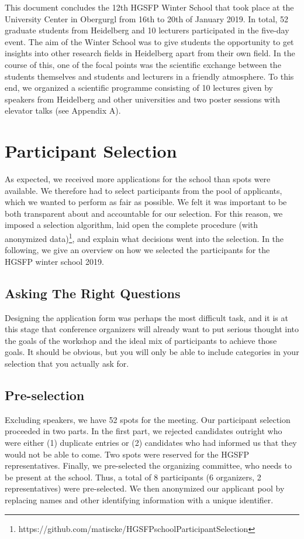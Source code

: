 This document concludes the 12th HGSFP Winter School that took place at
the University Center in Obergurgl from 16th to 20th of January 2019. In
total, 52 graduate students from Heidelberg and 10 lecturers participated
in the five-day event. The aim of the Winter School was to give students
the opportunity to get insights into other research fields in
Heidelberg apart from their own field. In the course of this, one of the
focal points was the scientific exchange between the students
themselves and students and lecturers in a friendly atmosphere. To this
end, we organized a scientific programme consisting of 10 lectures given
by speakers from Heidelberg and other universities and two poster
sessions with elevator talks (see Appendix A).


\section*{Participant Selection}
As expected, we received more applications for the school than spots were available. We therefore had to select participants from the pool of applicants, which we wanted to perform as fair as possible. We felt it was important to be both transparent about and accountable for our selection. For this reason, we imposed a selection algorithm, laid open the complete procedure (with anonymized data)\footnote{https://github.com/matiscke/HGSFPschoolParticipantSelection}, and explain what decisions went into the selection. In the following, we give an overview on how we selected the participants for the HGSFP winter school 2019.

\subsection*{Asking The Right Questions}
Designing the application form was perhaps the most difficult task, and it is at this stage that conference organizers will already want to put serious thought into the goals of the workshop and the ideal mix of participants to achieve those goals. It should be obvious, but you will only be able to include categories in your selection that you actually ask for.

\subsection*{Pre-selection}
Excluding speakers, we have 52 spots for the meeting. Our participant selection proceeded in two parts. In the first part, we rejected candidates outright who were either (1) duplicate entries or (2) candidates who had informed us that they would not be able to come. Two spots were reserved for the HGSFP representatives. Finally, we pre-selected the organizing committee, who needs to be present at the school. Thus, a total of 8 participants (6 organizers, 2 representatives) were pre-selected. We then anonymized our applicant pool by replacing names and other identifying information with a unique identifier. 

